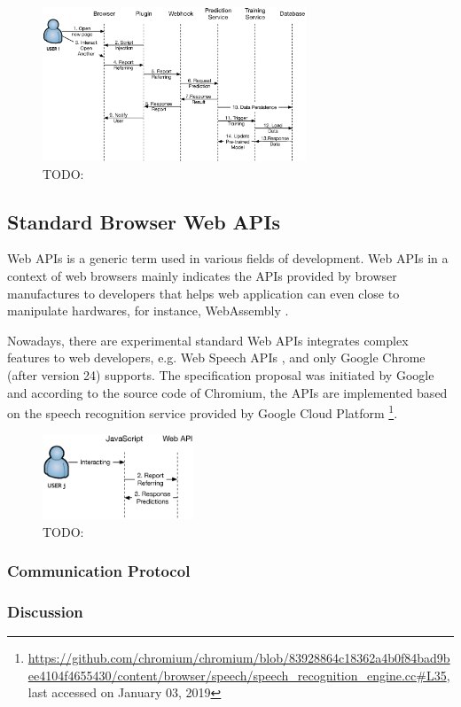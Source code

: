 \begin{figure}[H]
    \centering
    \includegraphics[width=0.7\textwidth]{figures/arch}
    \caption{TODO:}
    \label{fig:arch}
\end{figure}

\subsection{Standard Browser Web APIs}

Web APIs is a generic term used in various fields of development.
Web APIs in a context of web browsers mainly indicates the APIs provided
by browser manufactures to developers that helps web application can even close
to manipulate hardwares, for instance, WebAssembly \cite{w3c2018ws}.

Nowadays, there are experimental standard Web APIs integrates complex features to web developers, e.g. Web Speech APIs \cite{mozilla2019speech}, and only Google Chrome (after version 24) supports. The specification proposal was initiated by Google and according to the source code of Chromium, the APIs are implemented based on the speech recognition service provided by Google Cloud Platform \footnote{\url{https://github.com/chromium/chromium/blob/83928864c18362a4b0f84bad9bee4104f4655430/content/browser/speech/speech\_recognition\_engine.cc\#L35}, last accessed on January 03, 2019}.

\begin{figure}[H]
    \centering
    \includegraphics[width=0.4\textwidth]{figures/webapi}
    \caption{TODO:}
    \label{fig:webapi}
\end{figure}

\subsubsection{Communication Protocol}

\subsubsection{Discussion}

\cleardoublepage